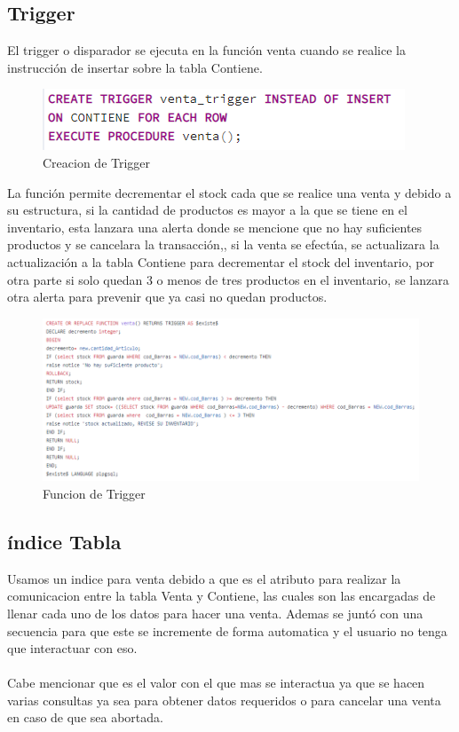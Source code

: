 \documentclass[12pt,letterpaper]{article}
\begin{document}
	\subsection{Trigger} 	
	El trigger o disparador se ejecuta en la función venta cuando se realice la instrucción de insertar sobre la tabla Contiene.
	\begin{figure}[H]
		\centering
		\includegraphics[scale=0.70]{Documentacion/img/Trigger.PNG}
		\caption{Creacion de Trigger}
	\end{figure}
	La función permite decrementar el stock cada que se realice una venta y debido a su estructura, si la cantidad de productos es mayor a la que se tiene en el inventario, esta lanzara una alerta donde se mencione que no hay suficientes productos y se cancelara la transacción,, si la venta se efectúa, se actualizara  la actualización a la tabla Contiene para decrementar el stock del inventario, por otra parte si solo quedan 3 o menos de tres productos en el inventario, se lanzara otra alerta para prevenir que ya casi no quedan productos. 
	\begin{figure}[H]
		\centering
		\includegraphics[scale=0.70]{Documentacion/img/FuncionTrigger.PNG}
		\caption{Funcion de Trigger}
	\end{figure}
	
	\subsection{índice Tabla}
	Usamos un indice para venta debido a que es el atributo para realizar la comunicacion entre la tabla Venta y Contiene, las cuales son las encargadas de llenar cada uno de los datos para hacer una venta. Ademas se juntó con una secuencia para que este se incremente de forma automatica y el usuario no tenga que interactuar con eso.\\
	\\Cabe mencionar que es el valor con el que mas se interactua ya que se hacen varias consultas ya sea para obtener datos requeridos o para cancelar una venta en caso de que sea abortada.
	
\end{document}
